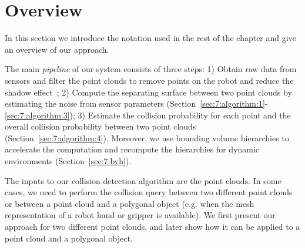 \section{Overview}
\label{sec:7:overview}
In this section we introduce the notation used in the rest of the chapter and give an overview of our approach.

The main \emph{pipeline} of our system
consists of three steps: 1) Obtain raw data from sensors and filter the point clouds to remove points on the robot and reduce the shadow effect~\cite{Ioan:2010}; 2) Compute the separating surface between two point clouds by estimating the noise from sensor parameters (Section~\ref{sec:7:algorithm:1}-\ref{sec:7:algorithm:3}); 3) Estimate the collision probability for each point and the overall collision probability between two point clouds (Section~\ref{sec:7:algorithm:4}). Moreover, we use bounding volume hierarchies to accelerate the computation and recompute the hierarchies for dynamic environments (Section~\ref{sec:7:bvh}).

The inputs to our collision detection algorithm are the point clouds. In some cases, we need to perform
the collision query between two different point clouds or between a point cloud and a polygonal object (e.g. when the mesh representation of a robot hand or gripper is available). We first present our
approach for two different point clouds, and later show how it can be applied to a point cloud and a polygonal object.

